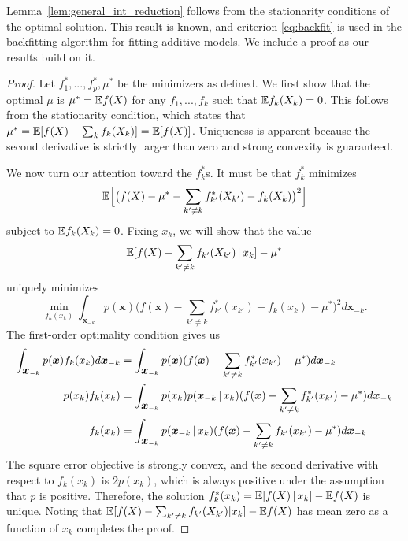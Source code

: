 Lemma~\ref{lem:general_int_reduction} follows from the stationarity
conditions of the optimal solution.   This result is known, and
criterion \eqref{eq:backfit} is used in the backfitting
algorithm for fitting additive models.   We include 
a proof as our results build on it.

\begin{proof}
  Let $f^*_1,...,f^*_p, \mu^*$ be the minimizers as defined.  We first
  show that the optimal $\mu$ is $\mu^* = {\mathbb E} f(X)$ for any $f_1, ...,
  f_k$ such that ${\mathbb E} f_k(X_k) = 0$. This follows from the stationarity
  condition, which states that $\mu^* = {\mathbb E}[ f(X) - \sum_k f_k(X_k)] =
  {\mathbb E}[ f(X) ]$. Uniqueness is apparent because the second derivative is
  strictly larger than zero and strong convexity is guaranteed.

  We now turn our attention toward the $f^*_k$s.  It must be that
  $f^*_k$ minimizes 
\begin{equation}
{\mathbb E}\Bigl[ \big( f(X) - \mu^* - \sum_{k' \neq k}
  f^*_{k'} (X_{k'}) - f_k (X_k) \big)^2\Bigr]
\end{equation}
subject to ${\mathbb E} f_k(X_k) = 0$.
Fixing $x_k$, we will show that the value 
\begin{equation}
{\mathbb E}[ f(X) - \sum_{k' \neq k}
f_{k'}(X_{k'}) {\,|\,} x_k] - \mu^*
\end{equation} 
uniquely minimizes
\begin{equation}
\min_{ f_k(x_k) } \int_{\mathbf{x}_{-k}} p(\mathbf{x}) 
         \Big( f(\mathbf{x}) - \sum_{k' \neq k} f^*_{k'} (x_{k'}) - f_k (x_k) -\mu^*\Big)^2 
                 d \mathbf{x}_{-k}.
\end{equation}
The first-order optimality condition gives us
\begin{align}
\int_{\mbox{\boldmath $x$}_{-k}} p(\mbox{\boldmath $x$}) f_k(x_k) d \mbox{\boldmath $x$}_{-k} &= 
  \int_{\mbox{\boldmath $x$}_{-k}} p(\mbox{\boldmath $x$}) 
      ( f(\mbox{\boldmath $x$})-\sum_{k' \neq k} f^*_{k'}(x_{k'})-\mu^*) d \mbox{\boldmath $x$}_{-k} \\  
p(x_k) f_k(x_k) &= \int_{\mbox{\boldmath $x$}_{-k}} p(x_k)
     p(\mbox{\boldmath $x$}_{-k} {\,|\,} x_k ) 
     ( f(\mbox{\boldmath $x$}) - \sum_{k' \neq k} f^*_{k'} (x_{k'})-\mu^*) 
              d \mbox{\boldmath $x$}_{-k} \\
f_k(x_k) &= \int_{\mbox{\boldmath $x$}_{-k}} 
       p(\mbox{\boldmath $x$}_{-k} {\,|\,} x_k ) 
     (f(\mbox{\boldmath $x$}) - \sum_{k'\neq k} f_{k'} (x_{k'})  -\mu^*) d \mbox{\boldmath $x$}_{-k} 
 \end{align}
The square error objective is strongly convex,
and the second derivative with respect to $f_k(x_k)$ is $2 p(x_k)$, which is always positive under the assumption that $p$ is positive. Therefore, the solution $f^*_k(x_k) = {\mathbb E}[ f(X) {\,|\,} x_k ] - {\mathbb E} f(X)$ is unique.
Noting that ${\mathbb E}[ f(X) -\sum_{k'\neq k} f_{k'}(X_{k'}) | x_k] - {\mathbb E} f(X)$ has mean zero as a function of $x_k$
completes the proof.
\end{proof}

